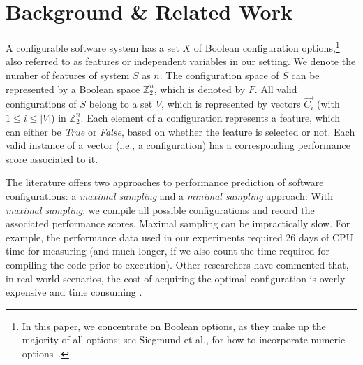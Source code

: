  
\section{Background \& Related Work}  
\label{sect:addit}

A configurable software system has a set $X$ of Boolean configuration options,\footnote{In this paper, we concentrate on Boolean options, as they make up the majority of all options; see Siegmund et al., for how to incorporate numeric options~\cite{SGA+15}.} also referred to as features or independent variables in our setting.
We denote the number of features of system $S$ as $n$. The configuration space of $S$ can be represented by a Boolean space $\mathbb{Z}_{2}^{n}$, which is denoted by $F$. All valid configurations of $S$ belong to a set $V$, 
which is represented by vectors $\vec{C_i}$ (with $1\leq i\leq \left\vert{V}\right\vert$) in $\mathbb{Z}_{2}^{n}$. Each element of a configuration represents a feature, which can either be \emph{True} or \emph{False}, based on whether the feature is selected or not. 
Each valid instance of a vector (i.e., a configuration) has a corresponding performance score associated to it. 

The literature offers two approaches to performance prediction of software configurations: a {\em maximal sampling} and a {\em minimal sampling} approach: 
With {\em maximal sampling}, we compile all  possible configurations and record the associated performance scores. 
Maximal sampling  can be impractically slow. For example, the performance data used in our experiments required  26 days of CPU time for measuring (and much longer, if we also count the time required for compiling the code prior to execution). 
 Other researchers have commented that,  in 
 real world scenarios, the cost of acquiring the optimal configuration is overly expensive and time consuming \cite{weiss2008maximizing}.
 
